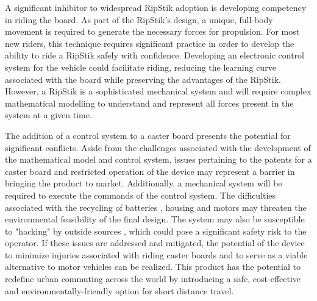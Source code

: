 \documentclass[12pt,letterpaper]{article}
\begin{document}
\par
A significant inhibitor to widespread RipStik adoption is developing competency in riding the board. 
As part of the RipStik’s design, a unique, full-body movement is required to generate the necessary forces for propulsion. 
For most new riders, this technique requires significant practice in order to develop the ability to ride a RipStik safely with confidence. 
Developing an electronic control system for the vehicle could facilitate riding, reducing the learning curve associated with the board while preserving the advantages of the RipStik. 
However, a RipStik is a sophisticated mechanical system and will require complex mathematical modelling to understand and represent all forces present in the system at a given time.

The addition of a control system to a caster board presents the potential for significant conflicts. 
Aside from the challenges associated with the development of the mathematical model and control system, issues pertaining to the patents for a caster board \cite{casterboardPatent} and restricted operation of the device \cite{TOLaws} may represent a barrier in bringing the product to market. 
Additionally, a mechanical system will be required to execute the commands of the control system. 
The difficulties associated with the recycling of batteries \cite{BatteryRecharge}, housing \cite{PlasticAssessment} and motors may threaten the environmental feasibility of the final design. 
The system may also be susceptible to "hacking" by outside sources \cite{DEFCON}, which could pose a significant safety risk to the operator. 
If these issues are addressed and mitigated, the potential of the device to minimize injuries associated with riding caster boards and to serve as a viable alternative to motor vehicles can be realized. 
This product has the potential to redefine urban commuting across the world by introducing a safe, cost-effective and environmentally-friendly option for short distance travel. 



\newpage
{}

\end{document}
